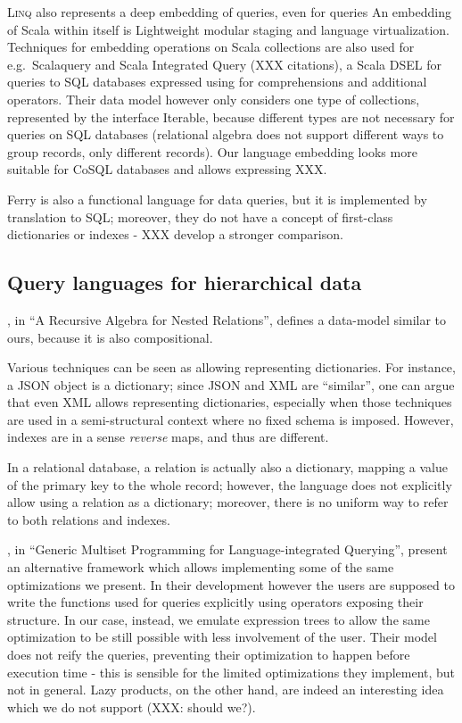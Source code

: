 \documentclass{article}
\begin{document}
\textsc{Linq} also represents a deep embedding of queries, even for
queries An embedding of Scala within itself is Lightweight modular
staging and language virtualization. Techniques for embedding operations
on Scala collections are also used for e.g.~Scalaquery and Scala
Integrated Query (XXX citations), a Scala DSEL for queries to SQL
databases expressed using for comprehensions and additional operators.
Their data model however only considers one type of collections,
represented by the interface Iterable, because different types are not
necessary for queries on SQL databases (relational algebra does not
support different ways to group records, only different records). Our
language embedding looks more suitable for CoSQL databases and allows
expressing XXX.

Ferry is also a functional language for data queries, but it is
implemented by translation to SQL; moreover, they do not have a concept
of first-class dictionaries or indexes - XXX develop a stronger
comparison.

\subsection{Query languages for hierarchical data}

\citet{Colby90}, in ``A Recursive Algebra for Nested Relations'',
defines a data-model similar to ours, because it is also compositional.

Various techniques can be seen as allowing representing dictionaries.
For instance, a JSON object is a dictionary; since JSON and XML are
``similar'', one can argue that even XML allows representing
dictionaries, especially when those techniques are used in a
semi-structural context where no fixed schema is imposed. However,
indexes are in a sense \emph{reverse} maps, and thus are different.

In a relational database, a relation is actually also a dictionary,
mapping a value of the primary key to the whole record; however, the
language does not explicitly allow using a relation as a dictionary;
moreover, there is no uniform way to refer to both relations and
indexes.

\citet{Henglein10}, in ``Generic Multiset Programming for
Language-integrated Querying'', present an alternative framework which
allows implementing some of the same optimizations we present. In their
development however the users are supposed to write the functions used
for queries explicitly using operators exposing their structure. In our
case, instead, we emulate expression trees to allow the same
optimization to be still possible with less involvement of the user.
Their model does not reify the queries, preventing their optimization to
happen before execution time - this is sensible for the limited
optimizations they implement, but not in general. Lazy products, on the
other hand, are indeed an interesting idea which we do not support (XXX:
should we?).
\end{document}
